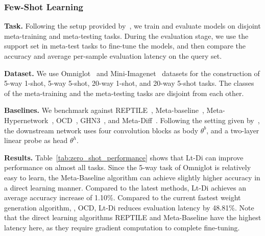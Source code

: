 \subsubsection{Few-Shot Learning}\label{sec:few_shot_learning} 
\noindent\textbf{Task.} Following the setup provided by~\citet{MAML}, we train and evaluate models on disjoint meta-training and meta-testing tasks. During the evaluation stage, we use the support set in meta-test tasks to fine-tune the models, and then compare the accuracy and average per-sample evaluation latency on the query set.
\par
\noindent\textbf{Dataset.} We use Omniglot~\cite{omniglot} and Mini-Imagenet~\cite{miniImagenet} datasets for the construction of 5-way 1-shot, 5-way 5-shot, 20-way 1-shot, and 20-way 5-shot tasks. The classes of the meta-training and the meta-testing tasks are disjoint from each other.
\par
\noindent\textbf{Baselines.}\label{sec:zero-shot}
We benchmark against REPTILE~\cite{REPTILE}, Meta-baseline~\cite{meta_baseline}, Meta-Hypernetwork~\cite{Meta-Hypernetwork}, OCD~\cite{OCD}, GHN3~\cite{GHN3}, and Meta-Diff~\cite{MetaDiff}. Following the setting given by~\citet{MAML}, the downstream network uses four convolution blocks as body $\theta^b$, and a two-layer linear probe as head $\theta^h$. 
\par
\noindent\textbf{Results.}
Table~\ref{tab:zero_shot_performance} shows that Lt-Di can improve performance on almost all tasks. Since the 5-way task of Omniglot is relatively easy to learn, the Meta-Baseline algorithm can achieve slightly higher accuracy in a direct learning manner. Compared to the latest methods, Lt-Di achieves an average accuracy increase of 1.10\%. Compared to the current fastest weight generation algorithm, \ie, OCD, Lt-Di reduces evaluation latency by 48.81\%. Note that the direct learning algorithms REPTILE and Meta-Baseline have the highest latency here, as they require gradient computation to complete fine-tuning.

